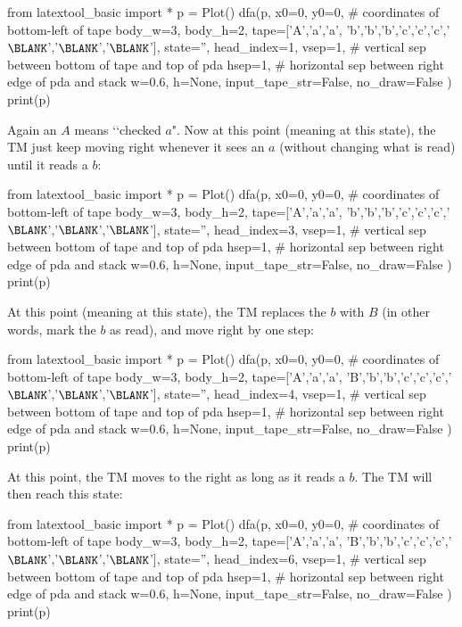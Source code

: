 \begin{eg}
\begin{python}
from latextool_basic import *
p = Plot()
dfa(p,
        x0=0, y0=0, # coordinates of bottom-left of tape
        body_w=3,
        body_h=2,
        tape=['A','a','a', 'b','b','b','c','c','c','$\BLANK$','$\BLANK$','$\BLANK$'], state='',
        head_index=1,
        vsep=1,  # vertical sep between bottom of tape and top of pda
        hsep=1,  # horizontal sep between right edge of pda and stack
        w=0.6, h=None,
        input_tape_str=False,
        no_draw=False
        )
print(p)
\end{python}
Again an $A$ means \lq\lq checked $a$".
Now at this point (meaning at this state),
the TM just keep moving right whenever it sees an $a$ (without changing what is read)
until it reads a $b$:
\begin{python}
from latextool_basic import *
p = Plot()
dfa(p,
        x0=0, y0=0, # coordinates of bottom-left of tape
        body_w=3,
        body_h=2,
        tape=['A','a','a', 'b','b','b','c','c','c','$\BLANK$','$\BLANK$','$\BLANK$'], state='',
        head_index=3,
        vsep=1,  # vertical sep between bottom of tape and top of pda
        hsep=1,  # horizontal sep between right edge of pda and stack
        w=0.6, h=None,
        input_tape_str=False,
        no_draw=False
        )
print(p)
\end{python}

At this point (meaning at this state), the TM replaces the $b$ with $B$ (in other words,
mark the $b$ as read), and move right by one step:
\begin{python}
from latextool_basic import *
p = Plot()
dfa(p,
        x0=0, y0=0, # coordinates of bottom-left of tape
        body_w=3,
        body_h=2,
        tape=['A','a','a', 'B','b','b','c','c','c','$\BLANK$','$\BLANK$','$\BLANK$'], state='',
        head_index=4,
        vsep=1,  # vertical sep between bottom of tape and top of pda
        hsep=1,  # horizontal sep between right edge of pda and stack
        w=0.6, h=None,
        input_tape_str=False,
        no_draw=False
        )
print(p)
\end{python}

At this point, the TM moves to the right as long as it reads a $b$.
The TM will then reach this state:
\begin{python}
from latextool_basic import *
p = Plot()
dfa(p,
        x0=0, y0=0, # coordinates of bottom-left of tape
        body_w=3,
        body_h=2,
        tape=['A','a','a', 'B','b','b','c','c','c','$\BLANK$','$\BLANK$','$\BLANK$'], state='',
        head_index=6,
        vsep=1,  # vertical sep between bottom of tape and top of pda
        hsep=1,  # horizontal sep between right edge of pda and stack
        w=0.6, h=None,
        input_tape_str=False,
        no_draw=False
        )
print(p)
\end{python}


\end{eg}
